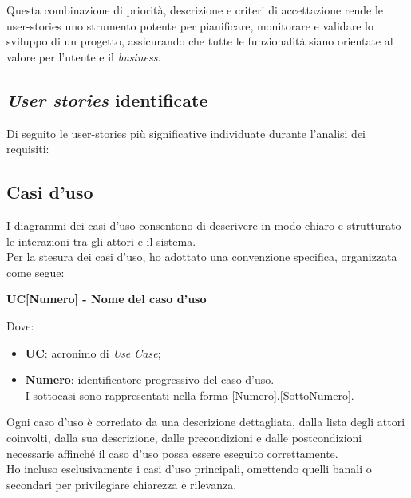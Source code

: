 \noindent Questa combinazione di priorità, descrizione e criteri di accettazione rende le \gls{user-stories} uno strumento potente per pianificare, monitorare e validare lo sviluppo di un progetto, assicurando che tutte le funzionalità siano orientate al valore per l’utente e il \textit{business}.

\pagebreak
\subsection*{\textit{User stories} identificate}

Di seguito le \gls{user-stories} più significative individuate durante l'analisi dei requisiti:
\label{subsubsec:epic-stories}



\subsection{Casi d'uso}
\label{subsec:casi-duso}

I diagrammi dei casi d’uso consentono di descrivere in modo chiaro e strutturato le interazioni tra gli attori e il sistema.\\

\noindent Per la stesura dei casi d’uso, ho adottato una convenzione specifica, organizzata come segue:

\begin{center}
\textbf{UC[Numero] - Nome del caso d’uso}
\end{center}

Dove:
\begin{itemize}
    \item \textbf{UC}: acronimo di \textit{Use Case};
    \item \textbf{Numero}: identificatore progressivo del caso d’uso.\\
    I sottocasi sono rappresentati nella forma [Numero].[SottoNumero].
\end{itemize}

\noindent Ogni caso d’uso è corredato da una descrizione dettagliata, dalla lista degli attori coinvolti, dalla sua descrizione, dalle precondizioni e dalle postcondizioni necessarie affinché il caso d’uso possa essere eseguito correttamente.\\

\noindent Ho incluso esclusivamente i casi d’uso principali, omettendo quelli banali o secondari per privilegiare chiarezza e rilevanza.\\

